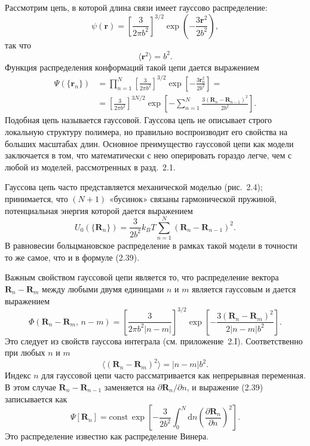 \documentclass[12pt,a4paper]{article}
\begin{document}
Рассмотрим цепь, в которой длина связи имеет гауссово распределение:
\begin{equation}
\psi(\boldsymbol{r}) = \left[\frac{3}{2\pi b^2}\right]^{3/2}\exp\left(-\frac{3\boldsymbol{r}^2}{2b^2}\right), \tag{2.37}
\end{equation}
так что
\begin{equation}
\langle\boldsymbol{r}^2\rangle = b^2. \tag{2.38}
\end{equation}
Функция распределения конформаций такой цепи дается выражением
\begin{align}
\Psi(\{\boldsymbol{r}_n\}) &= \prod_{n=1}^N\left[\frac{3}{2\pi b^2}\right]^{3/2}\exp\left[-\frac{3\boldsymbol{r}_n^2}{2b^2}\right] = \nonumber\\
&= \left[\frac{3}{2\pi b^2}\right]^{3N/2}\exp\left[-\sum_{n=1}^N\frac{3(\boldsymbol{R}_n - \boldsymbol{R}_{n-1})^2}{2b^2}\right]. \tag{2.39}
\end{align}
Подобная цепь называется гауссовой. Гауссова цепь не описывает строго локальную структуру полимера, но правильно воспроизводит его свойства на больших масштабах длин. Основное преимущество гауссовой цепи как модели заключается в том, что математически с нею оперировать гораздо легче, чем с любой из моделей, рассмотренных в разд.~2.1.

Гауссова цепь часто представляется механической моделью (рис.~2.4); принимается, что $(N + 1)$ «бусинок» связаны гармонической пружиной, потенциальная энергия которой дается выражением
\begin{equation}
U_0(\{\boldsymbol{R}_n\}) = \frac{3}{2b^2}k_B T \sum_{n=1}^N(\boldsymbol{R}_n - \boldsymbol{R}_{n-1})^2. \tag{2.40}
\end{equation}
В равновесии больцмановское распределение в рамках такой модели в точности то же самое, что и в формуле (2.39).

Важным свойством гауссовой цепи является то, что распределение вектора $\boldsymbol{R}_n - \boldsymbol{R}_m$ между любыми двумя единицами $n$ и $m$ является гауссовым и дается выражением
\begin{equation}
\Phi(\boldsymbol{R}_n - \boldsymbol{R}_m,\, n - m) = \left[\frac{3}{2\pi b^2 |n - m|}\right]^{3/2}\exp\left[-\frac{3(\boldsymbol{R}_n - \boldsymbol{R}_m)^2}{2|n - m|b^2}\right]. \tag{2.41}
\end{equation}
Это следует из свойств гауссова интеграла (см. приложение~2.I). Соответственно при любых $n$ и $m$
\begin{equation}
\langle(\boldsymbol{R}_n - \boldsymbol{R}_m)^2\rangle = |n - m|b^2. \tag{2.42}
\end{equation}
Индекс $n$ для гауссовой цепи часто рассматривается как непрерывная переменная. В этом случае $\boldsymbol{R}_n - \boldsymbol{R}_{n-1}$ заменяется на $\partial\boldsymbol{R}_n/\partial n$, и выражение (2.39) записывается как
\begin{equation}
\Psi[\boldsymbol{R}_n] = \text{const}\,\exp\left[-\frac{3}{2b^2}\int_0^N\!\mathrm{d}n\left(\frac{\partial\boldsymbol{R}_n}{\partial n}\right)^2\right]. \tag{2.43}
\end{equation}
Это распределение известно как распределение Винера.
\end{document}
